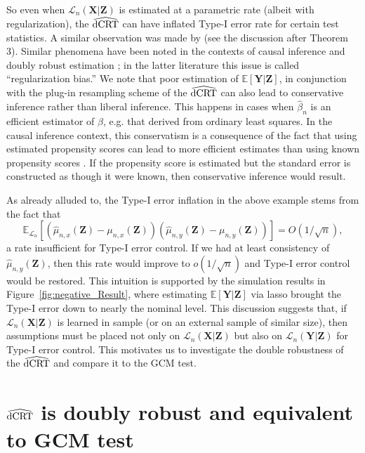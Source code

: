 \documentclass[aos]{imsart}
\theoremstyle{plain}
\theoremstyle{remark}
\newcommand{\E}{\mathbb E}								%
\newcommand{\prx}{\bm X}								%
\newcommand{\prz}{\bm Z}								%
\newcommand{\pry}{{\bm Y}}								%
\newcommand{\law}{\mathcal L}							%
\newcommand{\dCRThat}{\widehat{\textnormal{dCRT}}}		%
\begin{document}
So even when $\law_n(\prx|\prz)$ is estimated at a parametric rate (albeit with regularization),  the $\dCRThat$ can have inflated Type-I error rate for certain test statistics. A similar observation was made by \citet{Li2022} (see the discussion after Theorem 3). Similar phenomena have been noted in the contexts of causal inference \citep{Dukes2020a} and doubly robust estimation \citep{Chernozhukov2018, Chernozhukov2022}; in the latter literature this issue is called ``regularization bias.'' We note that poor estimation of $\E[\pry|\prz]$, in conjunction with the plug-in resampling scheme of the $\dCRThat$ can also lead to conservative inference rather than liberal inference. This happens in cases when $\widehat \beta_n$ is an efficient estimator of $\beta$, e.g. that derived from ordinary least squares. In the causal inference context, this conservatism is a consequence of the fact that using estimated propensity scores can lead to more efficient estimates than using known propensity scores \citep{Robins1992, Henmi2004}. If the propensity score is estimated but the standard error is constructed as though it were known, then conservative inference would result. 
    
As already alluded to, the Type-I error inflation in the above example stems from the fact that
\begin{equation*}
\E_{\law_n}[(\widehat \mu_{n,x}(\prz) - \mu_{n,x}(\prz))(\widehat \mu_{n,y}(\prz) - \mu_{n,y}(\prz))] = O(1/\sqrt{n}), 
\end{equation*}
a rate insufficient for Type-I error control. If we had at least consistency of $\widehat \mu_{n,y}(\prz)$, then this rate would improve to $o(1/\sqrt{n})$ and Type-I error control would be restored. This intuition is supported by the simulation results in Figure~\ref{fig:negative_Result}, where estimating $\E[\pry|\prz]$ via lasso brought the Type-I error down to nearly the nominal level. This discussion suggests that, if $\law_n(\prx|\prz)$ is learned in sample (or on an external sample of similar size), then assumptions must be placed not only on $\law_n(\prx|\prz)$ but also on $\law_n(\pry|\prz)$ for Type-I error control. This motivates us to investigate the double robustness of the $\dCRThat$ and compare it to the GCM test.

\section{$\dCRThat$ is doubly robust and equivalent to GCM test} \label{sec:dr-and-equivalence}
	
\end{document}

